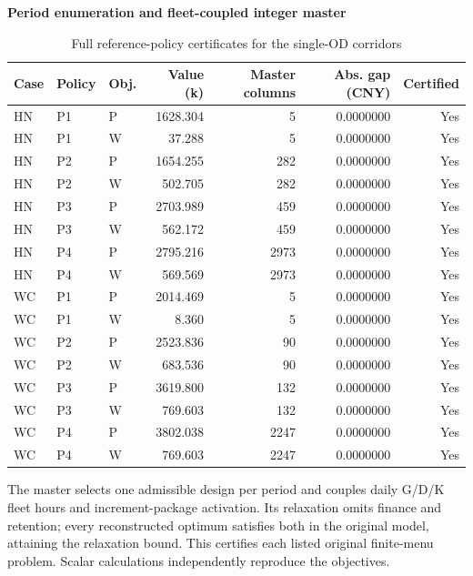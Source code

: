 \begin{table}[htbp]\centering
\caption{Full reference-policy certificates for the single-OD corridors}\label{tab:round2_exact}
\begin{minipage}{.95\textwidth}\fontsize{8}{10}\selectfont{}\setlength{\tabcolsep}{2pt}\renewcommand{\arraystretch}{1.08}
\par\noindent\textbf{Period enumeration and fleet-coupled integer master}\par\smallskip
\begin{tabular*}{\linewidth}{@{\extracolsep{\fill}}lllrrrr@{}}\toprule
Case & Policy & Obj. & Value (k) & Master columns & Abs. gap (CNY) & Certified \\
\midrule
HN & P1 & P & 1628.304 & 5 & 0.0000000 & Yes \\
HN & P1 & W & 37.288 & 5 & 0.0000000 & Yes \\
HN & P2 & P & 1654.255 & 282 & 0.0000000 & Yes \\
HN & P2 & W & 502.705 & 282 & 0.0000000 & Yes \\
HN & P3 & P & 2703.989 & 459 & 0.0000000 & Yes \\
HN & P3 & W & 562.172 & 459 & 0.0000000 & Yes \\
HN & P4 & P & 2795.216 & 2973 & 0.0000000 & Yes \\
HN & P4 & W & 569.569 & 2973 & 0.0000000 & Yes \\
WC & P1 & P & 2014.469 & 5 & 0.0000000 & Yes \\
WC & P1 & W & 8.360 & 5 & 0.0000000 & Yes \\
WC & P2 & P & 2523.836 & 90 & 0.0000000 & Yes \\
WC & P2 & W & 683.536 & 90 & 0.0000000 & Yes \\
WC & P3 & P & 3619.800 & 132 & 0.0000000 & Yes \\
WC & P3 & W & 769.603 & 132 & 0.0000000 & Yes \\
WC & P4 & P & 3802.038 & 2247 & 0.0000000 & Yes \\
WC & P4 & W & 769.603 & 2247 & 0.0000000 & Yes \\
\bottomrule\end{tabular*}\par\medskip
\par\noindent\fontsize{8}{9.5}\selectfont The master selects one admissible design per period and couples daily G/D/K fleet hours and increment-package activation. Its relaxation omits finance and retention; every reconstructed optimum satisfies both in the original model, attaining the relaxation bound. This certifies each listed original finite-menu problem. Scalar calculations independently reproduce the objectives.
\end{minipage}\end{table}
